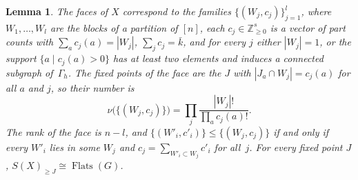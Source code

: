\documentclass[11pt,a4paper]{article}
\numberwithin{equation}{section}
\theoremstyle{plain}
\newtheorem{lemma}[theorem]{Lemma}
\theoremstyle{definition}
\theoremstyle{remark}
\newcommand{\Z}{\mathbb{Z}}
\DeclareMathOperator{\Flats}{Flats}
\begin{document}
\begin{lemma}\label{lem:partial-faces}
The faces of $X$ correspond to the families $\{(W_j,c_j)\}_{j=1}^l$, where $W_1,\dots,W_l$ are the blocks of a partition of $[n]$, each $c_j\in\Z_{\geqslant0}^s$ is a vector of part counts with $\sum_ac_j(a)=|W_j|$, $\sum_jc_j=\bar k$, and for every $j$ either $|W_j|=1$, or the support $\{a\mid c_j(a)>0\}$ has at least two elements and induces a connected subgraph of~$\Gamma_h$. The fixed points of the face are the $J$ with $|J_a\cap W_j|=c_j(a)$ for all $a$ and $j$, so their number is
\[
\nu\bigl(\{(W_j,c_j)\}\bigr)=\prod_j\frac{|W_j|!}{\prod_ac_j(a)!}.
\]
The rank of the face is $n-l$, and $\{(W'_i,c'_i)\}\leqslant\{(W_j,c_j)\}$ if and only if every $W'_i$ lies in some $W_j$ and $c_j=\sum_{W'_i\subset W_j}c'_i$ for all~$j$. For every fixed point $J$, $S(X)_{\geqslant J}\cong\Flats(G)$.
\end{lemma}
\end{document}
